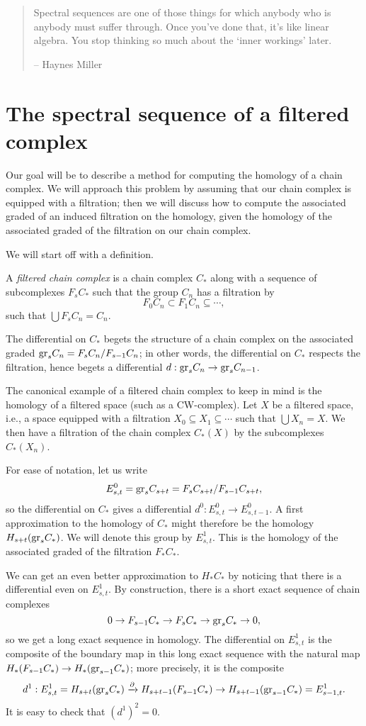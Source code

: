 \begin{quote}
    Spectral sequences are one of those things for which anybody who is
    anybody must suffer through. Once you've done that, it's like linear
    algebra. You stop thinking so much about the `inner workings' later.

    -- Haynes Miller
\end{quote}
\section{The spectral sequence of a filtered complex}
Our goal will be to describe a method for computing the homology of a chain
complex. We will approach this problem by assuming that our chain complex is
equipped with a filtration; then we will discuss how to compute the associated
graded of an induced filtration on the homology, given the homology of the
associated graded of the filtration on our chain complex.

We will start off with a definition.
\begin{definition}
    A \emph{filtered chain complex} is a chain complex $C_\ast$ along with a
    sequence of subcomplexes $F_s C_\ast$ such that the group $C_n$ has a
    filtration by
    $$F_0 C_n\subset F_1 C_n\subseteq \cdots,$$
    such that $\bigcup F_s C_n = C_n$.
\end{definition}
The differential on $C_\ast$ begets the structure of a chain
complex on the associated graded $\mathrm{gr}_s C_n = F_s C_n/F_{s-1} C_n$; in other
words, the differential on $C_\ast$ respects the filtration, hence begets a
differential $d:\mathrm{gr}_s C_n\to \mathrm{gr}_s C_{n-1}$.

The canonical example of a filtered chain complex to keep in mind is the
homology of a filtered space (such as a CW-complex). Let $X$ be a filtered
space, i.e., a space equipped with a filtration $X_0\subseteq X_1\subseteq
\cdots$ such that $\bigcup X_n = X$. We then have a filtration of the chain
complex $C_\ast(X)$ by the subcomplexes $C_\ast(X_n)$.

For ease of notation, let us write
$$E^0_{s,t} = \mathrm{gr}_s C_{s+t} = F_s C_{s+t}/F_{s-1} C_{s+t},$$
so the differential on $C_\ast$ gives a differential $d^0:E^0_{s,t}\to
E^0_{s,t-1}$. A first approximation to the homology of $C_\ast$ might therefore
be the homology $H_{s+t}(\mathrm{gr}_s C_\ast)$. We will denote this group by
$E^1_{s,t}$. This is the homology of the associated graded of the filtration
$F_\ast C_\ast$.

We can get an even better approximation to $H_\ast C_\ast$ by noticing that
there is a differential even on $E^1_{s,t}$. By construction, there is a short
exact sequence of chain complexes
$$0\to F_{s-1} C_\ast\to F_s C_\ast\to \mathrm{gr}_s C_\ast\to 0,$$
so we get a long exact sequence in homology. The differential on $E^1_{s,t}$ is
the composite of the boundary map in this long exact sequence with the natural
map $H_\ast(F_{s-1} C_\ast)\to H_\ast(\mathrm{gr}_{s-1} C_\ast)$; more precisely, it is
the composite
$$d^1:E^1_{s,t} = H_{s+t}(\mathrm{gr}_s C_\ast)\xrightarrow{{\partial}} H_{s+t-1}(F_{s-1}
C_\ast)\to H_{s+t-1}(\mathrm{gr}_{s-1}C_\ast) = E^1_{s-1,t}.$$
It is easy to check that $(d^1)^2 = 0$.

